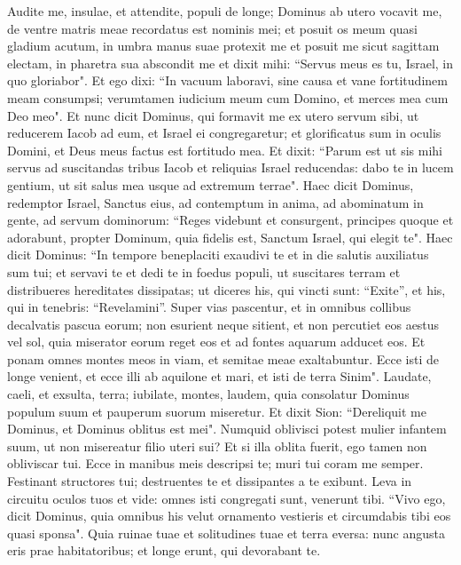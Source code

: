 \begin{biblechapter}  
\verse Audite me, insulae, et attendite, populi de longe; Dominus ab utero vocavit me, de ventre matris meae recordatus est nominis mei; 
\verse et posuit os meum quasi gladium acutum, in umbra manus suae protexit me et posuit me sicut sagittam electam, in pharetra sua abscondit me 
\verse et dixit mihi: “Servus meus es tu, Israel, in quo gloriabor". 
\verse Et ego dixi: “In vacuum laboravi, sine causa et vane fortitudinem meam consumpsi; verumtamen iudicium meum cum Domino, et merces mea cum Deo meo". 
\verse Et nunc dicit Dominus, qui formavit me ex utero servum sibi, ut reducerem Iacob ad eum, et Israel ei congregaretur; et glorificatus sum in oculis Domini, et Deus meus factus est fortitudo mea. 
\verse Et dixit: “Parum est ut sis mihi servus ad suscitandas tribus Iacob et reliquias Israel reducendas: dabo te in lucem gentium, ut sit salus mea usque ad extremum terrae". 
\verse Haec dicit Dominus, redemptor Israel, Sanctus eius, ad contemptum in anima, ad abominatum in gente, ad servum dominorum: “Reges videbunt et consurgent, principes quoque et adorabunt, propter Dominum, quia fidelis est, Sanctum Israel, qui elegit te". 
\verse Haec dicit Dominus: “In tempore beneplaciti exaudivi te et in die salutis auxiliatus sum tui; et servavi te et dedi te in foedus populi, ut suscitares terram et distribueres hereditates dissipatas; 
\verse ut diceres his, qui vincti sunt: “Exite”, et his, qui in tenebris: “Revelamini”. Super vias pascentur, et in omnibus collibus decalvatis pascua eorum; 
\verse non esurient neque sitient, et non percutiet eos aestus vel sol, quia miserator eorum reget eos et ad fontes aquarum adducet eos. 
\verse Et ponam omnes montes meos in viam, et semitae meae exaltabuntur. 
\verse Ecce isti de longe venient, et ecce illi ab aquilone et mari, et isti de terra Sinim". 
\verse Laudate, caeli, et exsulta, terra; iubilate, montes, laudem, quia consolatur Dominus populum suum et pauperum suorum miseretur. 
\verse Et dixit Sion: “Dereliquit me Dominus, et Dominus oblitus est mei". 
\verse Numquid oblivisci potest mulier infantem suum, ut non misereatur filio uteri sui? Et si illa oblita fuerit, ego tamen non obliviscar tui. 
\verse Ecce in manibus meis descripsi te; muri tui coram me semper. 
\verse Festinant structores tui; destruentes te et dissipantes a te exibunt. 
\verse Leva in circuitu oculos tuos et vide: omnes isti congregati sunt, venerunt tibi. “Vivo ego, dicit Dominus, quia omnibus his velut ornamento vestieris et circumdabis tibi eos quasi sponsa". 
\verse Quia ruinae tuae et solitudines tuae et terra eversa: nunc angusta eris prae habitatoribus; et longe erunt, qui devorabant te. 

\end{biblechapter}
